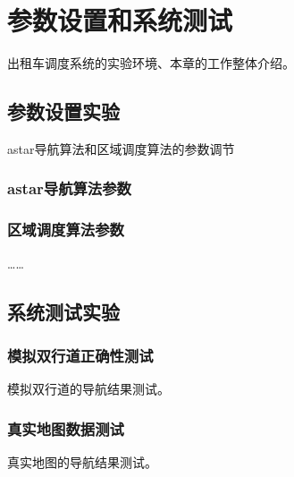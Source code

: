 \chapter{参数设置和系统测试}
出租车调度系统的实验环境、本章的工作整体介绍。
\section{参数设置实验}
astar导航算法和区域调度算法的参数调节
\subsection{astar导航算法参数}
\subsection{区域调度算法参数}

……

\section{系统测试实验}

\subsection{模拟双行道正确性测试}
模拟双行道的导航结果测试。
\subsection{真实地图数据测试}
真实地图的导航结果测试。